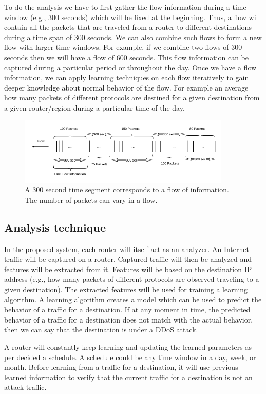\documentclass[12pt,oneside,a4paper]{article}
\begin{document}
To do the analysis we have to first gather the flow information during a time window (e.g., 300 seconds) which will be fixed at the beginning. Thus, a flow will contain all the packets that are traveled from a router to different destinations during a time span of 300 seconds. We can also combine such flows to form a new flow with larger time windows. For example, if we combine two flows of 300 seconds then we will have a flow of 600 seconds. This flow information can be captured during a particular period or throughout the day. Once we have a flow information, we can apply learning techniques on each flow iteratively to gain deeper knowledge about normal behavior of the flow. For example an average how many packets of different protocols are destined for a given destination from a given router/region during a particular time of the day.

\begin{figure}[H]
\centering
\includegraphics[width=0.90\textwidth]{Data_Flow_Capture.png}
\caption{A 300 second time segment corresponds to a flow of information. The number of packets can vary in a flow.} \label{fig:flow}
\end{figure}

\subsection{Analysis technique}
In the proposed system, each router will itself act as an analyzer. An Internet traffic will be captured on a router. Captured traffic will then be analyzed and features will be extracted from it. Features will be based on the destination IP address (e.g., how many packets of different protocols are observed traveling to a given destination). The extracted features will be used for training a learning algorithm. A learning algorithm creates a model which can be used to predict the behavior of a traffic for a destination. If at any moment in time, the predicted behavior of a traffic for a destination does not match with the actual behavior, then we can say that the destination is under a DDoS attack.

A router will constantly keep learning and updating the learned parameters as per decided a schedule. A schedule could be any time window in a day, week, or month. Before learning from a traffic for a destination, it will use previous learned information to verify that the current traffic for a destination is not an attack traffic.
\end{document}

